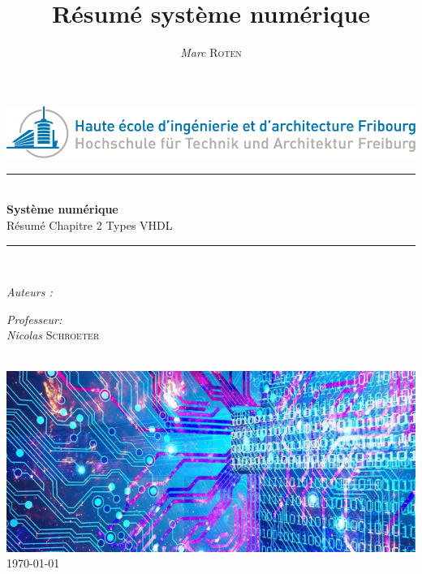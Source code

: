 

\title{Résumé système numérique} 
\author{\textsl{Marc} \textsc{Roten}}
\date{}


    \begin{titlepage}
        \begin{center}
            \includegraphics[scale=.4]{Img/heia-fr-logo.png}\\[1.3cm]
            
            \rule{\linewidth}{0.3mm} \\[0.3cm]
            {\huge \bfseries Système numérique\\[0.5cm]} 
            {\Large  Résumé Chapitre 2 Types VHDL}
            \rule{\linewidth}{0.3mm} \\[0.8cm]
            \noindent
            \begin{minipage}[t]{0.4\textwidth}
                \begin{flushleft} \large
                    \emph{Auteurs :}\\
                    \theauthor
                \end{flushleft}
            \end{minipage}
            \begin{minipage}[t]{0.4\textwidth} 
                \begin{flushright} \large
                    \emph{Professeur:}\\
                    \textsl{Nicolas} \textsc{ Schroeter}\\ 
                \end{flushright} 
                \vfill
            \end{minipage}\\[1.3cm]
            \includegraphics[scale=0.7]{Img/title.jpg}\\[1.5cm]
            \vspace*{1\baselineskip}
            \today \\[0.7cm]
        \end{center}
    \end{titlepage}
    \tableofcontents
    \clearpage

